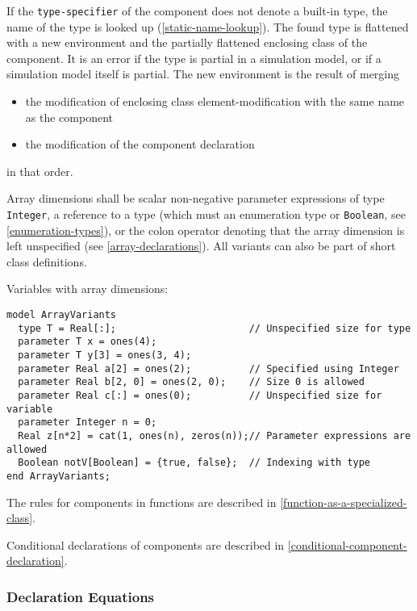 If the \lstinline[language=grammar]!type-specifier! of the component does not denote a built-in type, the name of the type is looked up (\cref{static-name-lookup}).
The found type is flattened with a new environment and the partially flattened enclosing class of the component.
It is an error if the type is partial in a simulation model, or if a simulation model itself is partial.
The new environment is the result of merging
\begin{itemize}
\item
  the modification of enclosing class element-modification with the same name as the component
\item
  the modification of the component declaration
\end{itemize}
in that order.

Array dimensions shall be scalar non-negative parameter expressions of type \lstinline!Integer!, a reference to a type (which must an enumeration type or \lstinline!Boolean!, see \cref{enumeration-types}), or the colon operator denoting that the array dimension is left unspecified (see \cref{array-declarations}).  All variants can also be part of short class definitions.

\begin{example}
Variables with array dimensions:
\begin{lstlisting}[language=modelica]
model ArrayVariants
  type T = Real[:];                       // Unspecified size for type
  parameter T x = ones(4);
  parameter T y[3] = ones(3, 4);
  parameter Real a[2] = ones(2);          // Specified using Integer
  parameter Real b[2, 0] = ones(2, 0);    // Size 0 is allowed
  parameter Real c[:] = ones(0);          // Unspecified size for variable
  parameter Integer n = 0;
  Real z[n*2] = cat(1, ones(n), zeros(n));// Parameter expressions are allowed
  Boolean notV[Boolean] = {true, false};  // Indexing with type
end ArrayVariants;
\end{lstlisting}
\end{example}

The rules for components in functions are described in \cref{function-as-a-specialized-class}.

Conditional declarations of components are described in \cref{conditional-component-declaration}.

\subsubsection{Declaration Equations}\label{declaration-equations}

